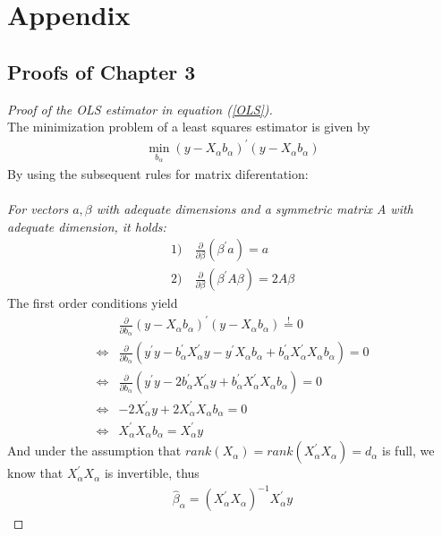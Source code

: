 \documentclass[Research_Module_ES.tex]{subfiles}
\begin{document}
\section*{Appendix }

\subsection*{Proofs of Chapter 3}
\begin{proof}[Proof of the OLS estimator in equation (\ref{OLS})]~\\
	The minimization problem of a least squares estimator is given by
	\begin{align*}
	\min_{b_\alpha}(y-X_\alpha b_\alpha)^\prime(y-X_\alpha b_\alpha)
	\end{align*}
	By using the subsequent rules for matrix diferentation:\\\\
	\textit{For vectors $a,\beta$ with adequate dimensions and a symmetric matrix A with adequate dimension, it holds:}
	\begin{align*}
	1)&~ \frac{\partial}{\partial \beta}(\beta^\prime a)=a\\
	2)&~\frac{\partial}{\partial \beta}(\beta^\prime A\beta)=2A\beta
	\end{align*}
	The first order conditions yield
	\begin{align*}
	& \frac{\partial}{\partial b_\alpha}(y-X_\alpha b_\alpha)^\prime(y-X_\alpha b_\alpha)\stackrel{!}{=}0\\
	\Leftrightarrow & \frac{\partial}{\partial b_\alpha}(y^\prime y-b_\alpha^\prime X_\alpha^\prime y-y^\prime X_\alpha b_\alpha+b_\alpha^\prime X_\alpha^\prime X_\alpha b_\alpha)=0\\
	\Leftrightarrow & \frac{\partial}{\partial b_\alpha}(y^\prime y-2b_\alpha^\prime X_\alpha^\prime y+b_\alpha^\prime X_\alpha^\prime X_\alpha b_\alpha)=0\\
	\Leftrightarrow & -2X_\alpha^\prime y +2 X_\alpha^\prime X_\alpha b_\alpha=0\\
	\Leftrightarrow & X_\alpha^\prime X_\alpha b_\alpha=X_\alpha^\prime y
	\end{align*}
	And under the assumption that $rank(X_\alpha)=rank(X_\alpha^\prime X_\alpha)=d_\alpha$ is full, we know that $X_\alpha^\prime X_\alpha$ is invertible, thus 
	\begin{align*}
	\hat{\beta}_\alpha=(X_\alpha^\prime X_\alpha)^{-1}X_\alpha^\prime y
	\end{align*}
\end{proof}
\end{document}
